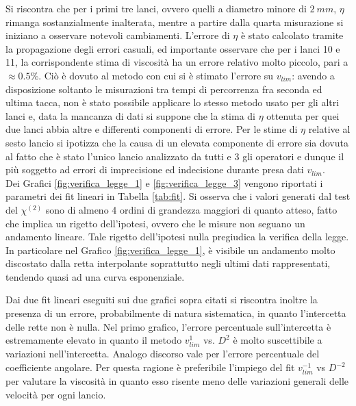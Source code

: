 \documentclass[a4paper,11pt,oneside]{article}
\begin{document}
Si riscontra che per i primi tre lanci, ovvero quelli a diametro minore di $\SI{2}{mm}$, $\eta$ rimanga sostanzialmente inalterata, mentre a partire dalla quarta misurazione si iniziano a osservare notevoli cambiamenti.\newline
L'errore di $\eta$ è stato calcolato tramite la propagazione degli errori casuali, ed importante osservare che per i lanci 10 e 11, la corrispondente stima di viscosità ha un errore relativo molto piccolo, pari a $\approx 0.5 \%$. Ciò è dovuto al metodo con cui si è stimato l'errore su $v_{lim}$: avendo a disposizione soltanto le misurazioni tra tempi di percorrenza fra seconda ed ultima tacca, non è stato possibile applicare lo stesso metodo usato per gli altri lanci e, data la mancanza di dati si suppone che la stima di $\eta$ ottenuta per quei due lanci abbia altre e differenti componenti di errore.
Per le stime di $\eta$ relative al sesto lancio si ipotizza che la causa di un elevata componente di errore sia dovuta al fatto che è stato l'unico lancio analizzato da tutti e 3 gli operatori e dunque il più soggetto ad errori di imprecisione ed indecisione durante presa dati $v_{lim}$.\\



Dei Grafici \ref{fig:verifica_legge_1} e \ref{fig:verifica_legge_3} vengono riportati i parametri dei fit lineari in Tabella \ref{tab:fit}. Si osserva che i valori generati dal test del $\chi^{(2)}$ sono di almeno 4 ordini di grandezza maggiori di quanto atteso, fatto che implica un rigetto dell'ipotesi, ovvero che le misure non seguano un andamento lineare. Tale rigetto dell'ipotesi nulla pregiudica la verifica della legge. 
In particolare nel Grafico \ref{fig:verifica_legge_1}, è visibile un andamento molto discostato dalla retta interpolante soprattutto negli ultimi dati rappresentati, tendendo quasi ad una curva esponenziale. \newline

Dai due fit lineari eseguiti sui due grafici sopra citati si riscontra inoltre la presenza di un errore, probabilmente di natura sistematica, in quanto l'intercetta delle rette non è nulla.
Nel primo grafico, l'errore percentuale sull'intercetta è estremamente elevato in quanto il metodo $v_{lim}^{1}$ vs. $D^{2}$ è molto suscettibile a variazioni nell'intercetta.
Analogo discorso vale per l'errore percentuale del coefficiente angolare. Per questa ragione è preferibile l'impiego del fit $v_{lim}^{-1}$ vs $D^{-2}$ per valutare la viscosità in quanto esso risente meno delle variazioni generali delle velocità per ogni lancio.\newline
\end{document}
